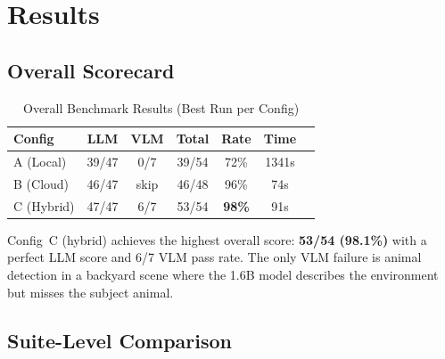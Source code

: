 \documentclass[conference]{IEEEtran}
\begin{document}

\section{Results}

\subsection{Overall Scorecard}

\begin{table}[h]
\centering
\caption{Overall Benchmark Results (Best Run per Config)}
\label{tab:overall}
\begin{tabular}{lcccccc}
\toprule
\textbf{Config} & \textbf{LLM} & \textbf{VLM} & \textbf{Total} & \textbf{Rate} & \textbf{Time} \\
\midrule
A (Local) & 39/47 & 0/7 & 39/54 & 72\% & 1341s \\
B (Cloud) & 46/47 & skip & 46/48 & 96\% & 74s \\
C (Hybrid) & 47/47 & 6/7 & 53/54 & \textbf{98\%} & 91s \\
\bottomrule
\end{tabular}
\end{table}

Config~C (hybrid) achieves the highest overall score: \textbf{53/54
(98.1\%)} with a perfect LLM score and 6/7 VLM pass rate. The only VLM
failure is animal detection in a backyard scene where the 1.6B model
describes the environment but misses the subject animal.

\subsection{Suite-Level Comparison}
\end{document}
